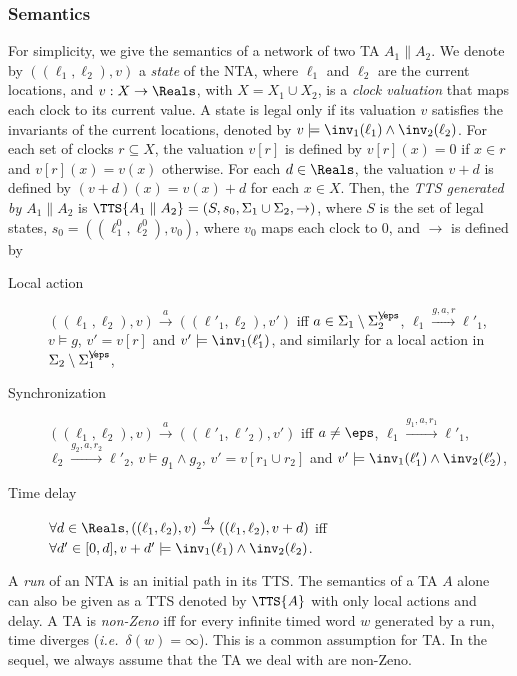\documentclass{LMCS}
\theoremstyle{plain}\newtheorem*{prop11}{Proposition~\ref{prop:states} bis}
\def\ie{{\em i.e.\ }}
\begin{document}
\subsubsection*{Semantics} For simplicity, we give the semantics of a network of two TA
$A_1\parallel A_2$. We denote by $((\ell_1,\ell_2), v)$ a \emph{state} of
the NTA, where  $\ell_1$ and $\ell_2$ are the current locations, and
$v:X\rightarrow \Reals$, with $X=X_1\cup X_2$, is a \emph{clock valuation}
that maps each clock to its current value. A state is legal only if its
valuation $v$ satisfies the invariants of the current locations, denoted by
$v \models \inv_1(\ell_1)\land \inv_2(\ell_2)$.
For each set of clocks $r\subseteq X$, the valuation $v[r]$ is defined by
$v[r](x)=0$ if $x\in r$ and $v[r](x)=v(x)$ otherwise.
For each $d \in \Reals$, the valuation $v+d$ is
defined by $(v+d)(x)=v(x)+d$ for each $x \in X$.
Then,
the \emph{TTS generated by $A_1\parallel A_2$} is
$\TTS{A_1\parallel A_2} = (S, s_0, \Sigma_1\cup\Sigma_2, {\rightarrow})$,
where
$S$ is the set of legal states,
$s_0=((\ell_1^0,\ell_2^0), v_{0})$, where $v_{0}$ maps each clock to 0,
and ${\rightarrow}$ is defined by
\begin{description}
  \item[Local action]
  $((\ell_1,\ell_2),v)\xrightarrow{a}((\ell'_1,\ell_2),v')$ iff
  $a\in\Sigma_1\setminus\Sigma_{2}^{\not\eps}$,
  $\ell_1\xrightarrow{g,a,r}\ell'_1$,
  $v \models g$, $v'= v[r]$ and $v' \models \inv_1(\ell'_1)$, and similarly
  for a local action in $\Sigma_2\setminus\Sigma_{1}^{\not\eps}$,
  \item[Synchronization]
  $((\ell_1,\ell_2),v)\xrightarrow{a}((\ell'_1,\ell'_2),v')$ iff $a\neq\eps$,
  $\ell_1\xrightarrow{g_1,a,r_1}\ell'_1$, \mbox{$\ell_2\xrightarrow{g_2,a,r_2}\ell'_2$},
  $v \models g_1\land g_2$, $v'= v[r_1\cup r_2]$ and
  $v' \models \inv_1(\ell'_1)\land\inv_2(\ell'_2)$,
  \item[Time delay] $\forall d\in \Reals,
  ((\ell_1,\ell_2),v)\xrightarrow{d}((\ell_1,\ell_2), v+d)$ iff
  $\forall d'\in[0,d], v+d' \models \inv_1(\ell_1)\land\inv_2(\ell_2)$.
\end{description}

A \emph{run} of an NTA  is an initial path in its TTS.
The semantics of a TA $A$ alone can also be given as a TTS denoted by
$\TTS{A}$ with only local actions and delay.
A TA is \emph{non-Zeno} iff for every infinite timed word $w$ generated by a
run, time diverges (\ie $\delta(w) = \infty$).
This is a common assumption for TA\@. In the sequel,
we always assume that the TA we deal with are non-Zeno.
\end{document}
